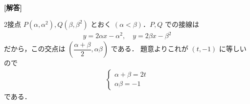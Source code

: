 \documentclass[../../main.tex]{subfiles}
\begin{document}
\begin{oframed}
  
\end{oframed}

{\bf [解答]}

2接点 $P(\alpha, \alpha^2), Q(\beta, \beta^2)$ とおく $(\alpha < \beta)$．$P, Q$ での接線は
\begin{align}
  y = 2\alpha x - \alpha^2, \quad y = 2\beta x - \beta^2
\end{align}
だから，この交点は $\left( \dfrac{\alpha+\beta}{2}, \alpha\beta \right)$ である．
題意よりこれが $(t, -1)$ に等しいので
\begin{align}
  \begin{cases}
    \alpha + \beta = 2t \\
    \alpha\beta = -1
  \end{cases} \label{eq:1}
\end{align}
である．
\end{document}
